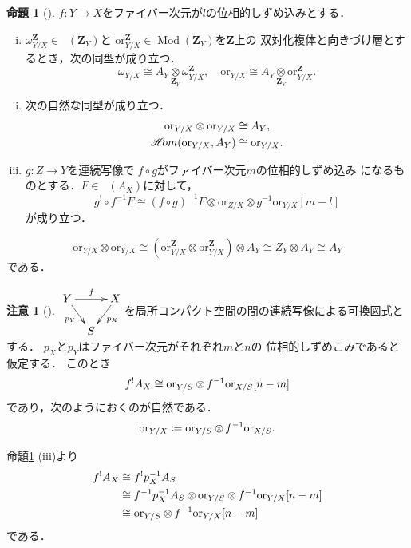 \documentclass[uplatex,dvipdfmx,a4paper,10pt,draft]{jsarticle}
\makeatletter
\theoremstyle{definition}
\newcommand{\zz}{\mathbf{Z}}
\newcommand{\Mod}{\mathop{\mathrm{Mod}}\nolimits}
\renewenvironment{proof}[1][\proofname]{\par
  \pushQED{\qed}%
  \normalfont \topsep6\p@\@plus6\p@\relax
  \trivlist
  \item[\hskip\labelsep
         \bfseries
    {#1}]\ignorespaces
}{%
  \popQED\endtrivlist\@endpefalse
}
\renewcommand{\proofname}{証明.}
\numberwithin{equation}{section}
\newcommand{\Dompl}{\mathop{\mathsf{D}^\mathrm{+}}\nolimits}
\newcommand{\HOM}{\mathop{\mathscr{H}\hspace{-2pt}om}\nolimits}%
\newcommand{\ori}{\mathord{\mathrm{or}}}
\newcommand{\tens}[1][]{\mathbin{\otimes_{\raise1.5ex\hbox to-.1em{}{#1}}}}
\newcommand{\ttens}[1][]{\mathbin{\mathop{\overset{\mathrm{}}{\tens}}_{#1}}}
\theoremstyle{mystyle}
\newtheorem{RMK}[AXM]{注意}
\newtheorem{myprp}[mythm]{命題}
\newenvironment{prp}{\begin{prpbox}\begin{myprp}}{\end{myprp}\end{prpbox}}
\makeatother
\begin{document}
\begin{prp}[{\cite[命題3.3.4]{KS90}}]\label{334}
    \(f\colon Y\to X\)をファイバー次元が\(l\)の位相的しずめ込みとする．
    \begin{enumerate}[(i)]
        \item \(\omega_{Y/X}^\zz\in\Dompl(\zz_Y)\)と
        \(\ori_{Y/X}^\zz\in\Mod(\zz_Y)\)を\(\zz\)上の
        双対化複体と向きづけ層とするとき，次の同型が成り立つ．\[
            \omega_{Y/X}\cong A_Y
            \mathop{\otimes}\limits_{\zz_Y}
            \omega_{Y/X}^\zz, 
            \quad
            \ori_{Y/X}\cong A_Y
            \mathop{\otimes}\limits_{\zz_Y}
            \ori_{Y/X}^\zz. 
        \]
        \item 次の自然な同型が成り立つ．
        \begin{align*}
                \ori_{Y/X}\otimes \ori_{Y/X}&\cong A_Y,\\
                \HOM(\ori_{Y/X},A_Y)&\cong \ori_{Y/X}.
        \end{align*}
        \item \(g\colon Z\to Y\)を連続写像で
        \(f\circ g\)がファイバー次元\(m\)の位相的しずめ込み
        になるものとする．\(F\in\Dompl(A_X)\)に対して，
        \[
            g^{!}\circ f^{-1}F
            \cong
            \left(f\circ g\right)^{-1}F
            \otimes \ori_{Z/X}
            \otimes g^{-1}\ori_{Y/X}[m-l]
        \]が成り立つ．
    \end{enumerate}
\end{prp}


\[
    \ori_{Y/X}\otimes \ori_{Y/X}
    \cong
    \left(\ori_{Y/X}^\zz\otimes \ori_{Y/X}^\zz\right)\otimes A_Y
    \cong Z_Y\otimes A_Y
    \cong A_Y
\]
である．
\begin{RMK}[{\cite[Remark 3.3.5]{KS90}}]
    \(\vcenter{
        \xymatrix@C=8pt@R=16pt{
            Y
            \ar[rd]_{p_{Y}}
            \ar[rr]^{f}
            &&
            X
            \ar[ld]^{p_X}
            \\
            &
            S
            &
        }
    }\)を局所コンパクト空間の間の連続写像による可換図式とする．
    \(p_X\)と\(p_Y\)はファイバー次元がそれぞれ\(m\)と\(n\)の
    位相的しずめこみであると仮定する．
    このとき\[
        f^{!}A_{X}\cong
        \ori_{Y/S}\tens[]f^{-1}\ori_{X/S}[n-m]
    \]であり，次のようにおくのが自然である．
    \begin{equation}
        \ori_{Y/X}\coloneqq \ori_{Y/S}\tens[]f^{-1}\ori_{X/S}.
    \end{equation}
\end{RMK}
\begin{proof}
    命題\ref{334} (iii)より
    \begin{align*}
        f^{!}A_X
        &\cong f^{!}p_{X}^{-1}A_{S}\\
        &\cong f^{-1}p_{X}^{-1}A_{S}\tens[]\ori_{Y/S}\tens[]f^{-1}\ori_{Y/X}[n-m]\\
        &\cong \ori_{Y/S}\tens[]f^{-1}\ori_{Y/X}[n-m]
    \end{align*}
    である．
\end{proof}
\end{document}

